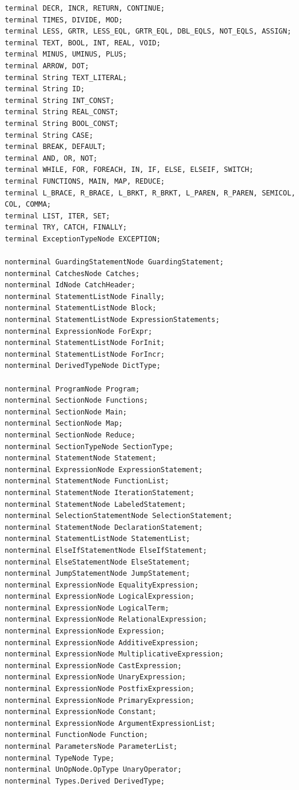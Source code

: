 \documentclass{book}
\begin{document}
\begin{verbatim}
terminal DECR, INCR, RETURN, CONTINUE;
terminal TIMES, DIVIDE, MOD;
terminal LESS, GRTR, LESS_EQL, GRTR_EQL, DBL_EQLS, NOT_EQLS, ASSIGN;
terminal TEXT, BOOL, INT, REAL, VOID;
terminal MINUS, UMINUS, PLUS;
terminal ARROW, DOT;
terminal String TEXT_LITERAL;
terminal String ID;
terminal String INT_CONST;
terminal String REAL_CONST;
terminal String BOOL_CONST;
terminal String CASE;
terminal BREAK, DEFAULT;
terminal AND, OR, NOT;
terminal WHILE, FOR, FOREACH, IN, IF, ELSE, ELSEIF, SWITCH;
terminal FUNCTIONS, MAIN, MAP, REDUCE;
terminal L_BRACE, R_BRACE, L_BRKT, R_BRKT, L_PAREN, R_PAREN, SEMICOL, COL, COMMA;
terminal LIST, ITER, SET;
terminal TRY, CATCH, FINALLY;
terminal ExceptionTypeNode EXCEPTION;

nonterminal GuardingStatementNode GuardingStatement;
nonterminal CatchesNode Catches;
nonterminal IdNode CatchHeader;
nonterminal StatementListNode Finally;
nonterminal StatementListNode Block;
nonterminal StatementListNode ExpressionStatements;
nonterminal ExpressionNode ForExpr;
nonterminal StatementListNode ForInit;
nonterminal StatementListNode ForIncr;
nonterminal DerivedTypeNode DictType;

nonterminal ProgramNode Program;
nonterminal SectionNode Functions;
nonterminal SectionNode Main;
nonterminal SectionNode Map;
nonterminal SectionNode Reduce;
nonterminal SectionTypeNode SectionType;
nonterminal StatementNode Statement;
nonterminal ExpressionNode ExpressionStatement;
nonterminal StatementNode FunctionList;
nonterminal StatementNode IterationStatement;
nonterminal StatementNode LabeledStatement;
nonterminal SelectionStatementNode SelectionStatement;
nonterminal StatementNode DeclarationStatement;
nonterminal StatementListNode StatementList;
nonterminal ElseIfStatementNode ElseIfStatement;
nonterminal ElseStatementNode ElseStatement;
nonterminal JumpStatementNode JumpStatement;
nonterminal ExpressionNode EqualityExpression;
nonterminal ExpressionNode LogicalExpression;
nonterminal ExpressionNode LogicalTerm;
nonterminal ExpressionNode RelationalExpression;
nonterminal ExpressionNode Expression;
nonterminal ExpressionNode AdditiveExpression;
nonterminal ExpressionNode MultiplicativeExpression;
nonterminal ExpressionNode CastExpression;
nonterminal ExpressionNode UnaryExpression;
nonterminal ExpressionNode PostfixExpression;
nonterminal ExpressionNode PrimaryExpression;
nonterminal ExpressionNode Constant;
nonterminal ExpressionNode ArgumentExpressionList;
nonterminal FunctionNode Function;
nonterminal ParametersNode ParameterList;
nonterminal TypeNode Type;
nonterminal UnOpNode.OpType UnaryOperator;
nonterminal Types.Derived DerivedType;


\end{verbatim}
\end{document}
